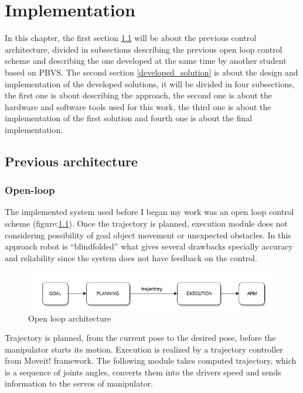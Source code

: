 
\chapter{Implementation}
\label{chapter:Implementation}

In this chapter, the first section \ref{Previous_architecture} will be about the previous control architecture, divided in subsections describing the previous open loop control scheme and describing the one developed at the same time by another student based on \gls{PBVS}. The second section \ref{developed_solution} is about the  design and implementation of the developed solutions, it will be divided in four subsections, the first one is about describing the approach, the second one is about the hardware and software tools used for this work, the third one is about the implementation of the first solution and fourth one is about the final implementation.

\section{Previous architecture}
\label{Previous_architecture}
\subsection{Open-loop}
The implemented system used before I began my work was an open loop control scheme (figure:\ref{pict:open_loop}). Once the trajectory is planned, execution module does not considering possibility of goal object movement or unexpected obstacles. In this approach robot is “blindfolded” what gives several drawbacks specially accuracy and reliability since the system does not have feedback on the control.
\begin{figure} [!ht]
    \centering
    \includegraphics[width=0.75\linewidth]{images/open_loop.png}
    \caption{Open loop architecture}
    \label{pict:open_loop}
\end{figure}

Trajectory is planned, from the current pose to the desired pose, before the manipulator starts its motion. Execution is realized by a trajectory controller from Moveit! framework. The following module takes computed trajectory, which is a sequence of joints angles, converts them into the drivers speed and sends information to the servos of manipulator. 

